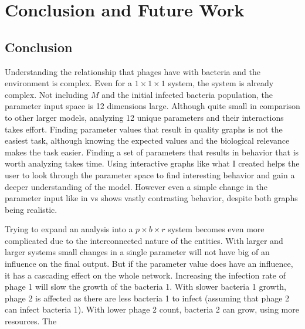 \chapter{Conclusion and Future Work}
\label{CAFW}

\section{Conclusion}
\label{Conclusion}
Understanding the relationship that phages have with bacteria and the environment is complex. 
Even for a $1\times1\times1$ system, the system is already complex. 
Not including $M$ and the initial infected bacteria population, the parameter input space is 12 dimensions large. 
Although quite small in comparison to other larger models, analyzing 12 unique parameters and their interactions takes effort. 
Finding parameter values that result in quality graphs is not the easiest task, although knowing the expected values and the biological relevance makes the task easier. 
Finding a set of parameters that results in behavior that is worth analyzing takes time. 
Using interactive graphs like what I created helps the user to look through the parameter space to find interesting behavior and gain a deeper understanding of the model. 
However even a simple change in the parameter input like in  vs  shows vastly contrasting behavior, despite both graphs being realistic. 

Trying to expand an analysis into a $p\times b\times r$ system becomes even more complicated due to the interconnected nature of the entities. 
With larger and larger systems small changes in a single parameter will not have big of an influence on the final output. 
But if the parameter value does have an influence, it has a cascading effect on the whole network. 
Increasing the infection rate of phage 1 will slow the growth of the bacteria 1. 
With slower bacteria 1 growth, phage 2 is affected as there are less bacteria 1 to infect (assuming that phage 2 can infect bacteria 1). With lower phage 2 count, bacteria 2 can grow, using more resources. 
The 


